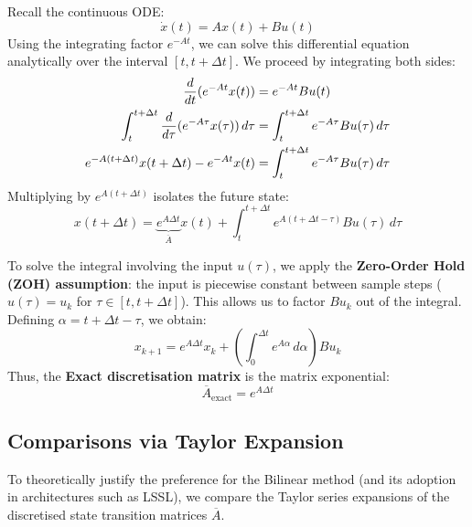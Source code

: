 \documentclass[a4paper,11pt]{article}
\begin{document}
Recall the continuous ODE:
\begin{equation} \label{eq:exact_ode}
    \dot{x}(t) = A x(t) + B u(t)
\end{equation}
Using the integrating factor $e^{-At}$, we can solve this differential equation analytically over the interval $[t, t+\Delta t]$. We proceed by integrating both sides:
\begin{align}
    \frac{d}{dt} (e^{-At} x(t)) &= e^{-At} B u(t) \label{eq:integrating_factor} \\
    \int_{t}^{t+\Delta t} \frac{d}{d\tau} (e^{-A\tau} x(\tau)) \, d\tau &= \int_{t}^{t+\Delta t} e^{-A\tau} B u(\tau) \, d\tau \notag \\
    e^{-A(t+\Delta t)} x(t+\Delta t) - e^{-At} x(t) &= \int_{t}^{t+\Delta t} e^{-A\tau} B u(\tau) \, d\tau \label{eq:integrated_form}
\end{align}
Multiplying by $e^{A(t+\Delta t)}$ isolates the future state:
\begin{equation} \label{eq:isolated_state}
    x(t+\Delta t) = \underbrace{e^{A\Delta t}}_{\overline{A}} x(t) + \int_{t}^{t+\Delta t} e^{A(t+\Delta t - \tau)} B u(\tau) \, d\tau
\end{equation}

To solve the integral involving the input $u(\tau)$, we apply the \textbf{Zero-Order Hold (ZOH) assumption}: the input is piecewise constant between sample steps ($u(\tau) = u_k$ for $\tau \in [t, t+\Delta t]$).
This allows us to factor $B u_k$ out of the integral. Defining $\alpha = t+\Delta t - \tau$, we obtain:
\begin{equation} \label{eq:zoh_result}
    x_{k+1} = e^{A\Delta t} x_k + \left( \int_{0}^{\Delta t} e^{A\alpha} \, d\alpha \right) B u_k
\end{equation}
Thus, the \textbf{Exact discretisation matrix} is the matrix exponential:
\begin{equation} \label{eq:exact_matrix}
    \overline{A}_{\text{exact}} = e^{A\Delta t}
\end{equation}

\subsection{Comparisons via Taylor Expansion}
\label{sec:taylor_expansion}

To theoretically justify the preference for the Bilinear method (and its adoption in architectures such as LSSL), we compare the Taylor series expansions of the discretised state transition matrices $\overline{A}$.
\end{document}
